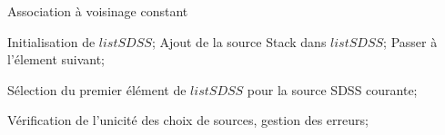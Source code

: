	
	
	\begin{algorithm}
		\caption{Association à voisinage constant}
		\label{algo:cmp-vois}
		\begin{algorithmic}[1]
				\State Initialisation de $listSDSS$; 
						\State Ajout de la source Stack dans $listSDSS$;
					\Else
						\State Passer à l'élement suivant;
					\EndIf
				\EndFor

				\State Sélection du premier élément de $listSDSS$ pour la source SDSS courante;

			\EndFor

			\State Vérification de l'unicité des choix de sources, gestion des erreurs;
		\end{algorithmic}
	\end{algorithm}


